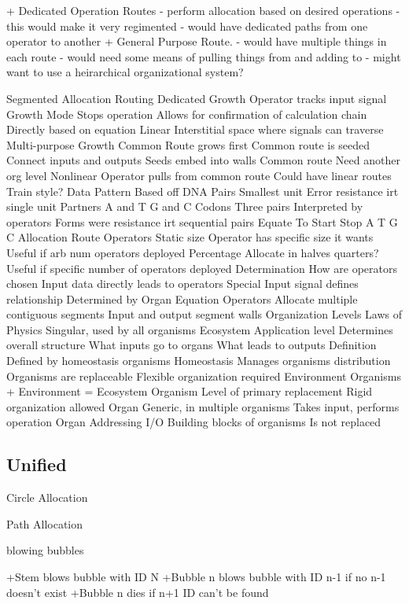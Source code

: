 \documentclass[article,12pt,oneside]{memoir}
\begin{document}
+ Dedicated Operation Routes
- perform allocation based on desired operations
- this would make it very regimented
- would have dedicated paths from one operator to another
+ General Purpose Route.
- would have multiple things in each route
- would need some means of pulling things from and adding to
- might want to use a heirarchical organizational system?


Segmented Allocation
Routing
Dedicated
Growth
Operator tracks input signal
Growth Mode
Stops operation
Allows for confirmation of calculation chain
Directly based on equation
Linear
Interstitial space where signals can traverse
Multi-purpose
Growth
Common Route grows first
Common route is seeded
Connect inputs and outputs
Seeds embed into walls
Common route
Need another org level
Nonlinear
Operator pulls from common route
Could have linear routes
Train style?
Data
Pattern
Based off DNA
Pairs
Smallest unit
Error resistance irt single unit
Partners
A and T
G and C
Codons
Three pairs
Interpreted by operators
Forms were resistance irt sequential pairs
Equate To
Start
Stop
A
T
G
C
Allocation
Route
Operators
Static size
Operator has specific size it wants
Useful if arb num operators deployed
Percentage
Allocate in halves quarters?
Useful if specific number of operators deployed
Determination
How are operators chosen
Input data directly leads to operators
Special Input signal defines relationship​
Determined by Organ Equation
Operators
Allocate multiple contiguous segments
Input and output segment walls
Organization Levels
Laws of Physics
Singular, used by all organisms
Ecosystem
Application level
Determines
overall structure
What inputs go to organs
What leads to outputs
Definition
Defined by homeostasis organisms
Homeostasis
Manages organisms distribution
Organisms are replaceable
Flexible organization required
Environment
Organisms + Environment = Ecosystem
Organism
Level of primary replacement
Rigid organization allowed
Organ
Generic, in multiple organisms
Takes input, performs operation
Organ Addressing I/O
Building blocks of organisms
Is not replaced


\subsection{Unified}

Circle Allocation

Path Allocation

blowing bubbles

+Stem blows bubble with ID N
+Bubble n blows bubble with ID n-1 if no n-1 doesn't exist
+Bubble n dies if n+1 ID can't be found 
\end{document}
